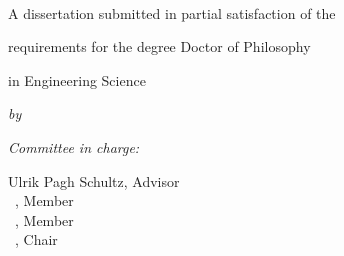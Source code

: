 \begin{titlepage}
	\centering
	{\large \publisher\par}
	~

	\vspace{36pt}
	{\Huge{}\selectfont\bfseries\booktitle\par}
	\vspace{24pt}

	{\large A dissertation submitted in partial satisfaction of the\par\vspace*{.8ex}
	requirements for the degree Doctor of Philosophy\par\vspace*{.8ex}
	in Engineering Science}

	\vspace{12pt}
	{\large\itshape by\par}
	\vspace{6pt}
	{\Large\itshape \authorname\par}
	\vspace{24pt}

	{\begin{flushleft}{\itshape Committee in charge:}
		\begin{multicols}{2}
			{Ulrik Pagh Schultz, Advisor\\\vspace*{.8ex}
			~, Member\\\vspace*{.8ex}%
			~, Member\\\vspace*{.8ex}%
			~, Chair\\%
			}\par
			\columnbreak
			{~\\
			~\\
			~}\par
		\end{multicols}
		\vspace{6pt}
		\begin{multicols}{2}
		~\\\columnbreak {\itshape %
		                }
		\end{multicols}	
	\end{flushleft}}

	{\large \editionyear{}}
\end{titlepage}


